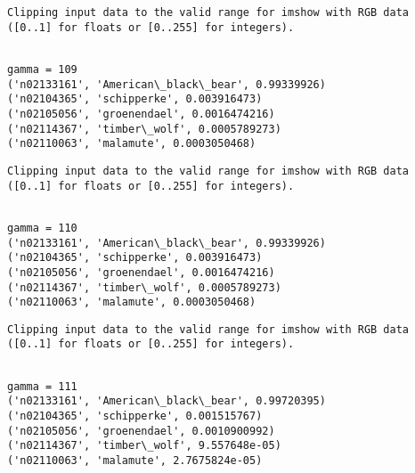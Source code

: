 \documentclass[11pt]{article}
\begin{document}
    \begin{Verbatim}[commandchars=\\\{\}]
Clipping input data to the valid range for imshow with RGB data ([0..1] for floats or [0..255] for integers).

    \end{Verbatim}

    \begin{Verbatim}[commandchars=\\\{\}]

gamma = 109
('n02133161', 'American\_black\_bear', 0.99339926)
('n02104365', 'schipperke', 0.003916473)
('n02105056', 'groenendael', 0.0016474216)
('n02114367', 'timber\_wolf', 0.0005789273)
('n02110063', 'malamute', 0.0003050468)

    \end{Verbatim}

    \begin{Verbatim}[commandchars=\\\{\}]
Clipping input data to the valid range for imshow with RGB data ([0..1] for floats or [0..255] for integers).

    \end{Verbatim}

    \begin{Verbatim}[commandchars=\\\{\}]

gamma = 110
('n02133161', 'American\_black\_bear', 0.99339926)
('n02104365', 'schipperke', 0.003916473)
('n02105056', 'groenendael', 0.0016474216)
('n02114367', 'timber\_wolf', 0.0005789273)
('n02110063', 'malamute', 0.0003050468)

    \end{Verbatim}

    \begin{Verbatim}[commandchars=\\\{\}]
Clipping input data to the valid range for imshow with RGB data ([0..1] for floats or [0..255] for integers).

    \end{Verbatim}

    \begin{Verbatim}[commandchars=\\\{\}]

gamma = 111
('n02133161', 'American\_black\_bear', 0.99720395)
('n02104365', 'schipperke', 0.001515767)
('n02105056', 'groenendael', 0.0010900992)
('n02114367', 'timber\_wolf', 9.557648e-05)
('n02110063', 'malamute', 2.7675824e-05)

    \end{Verbatim}
\end{document}
